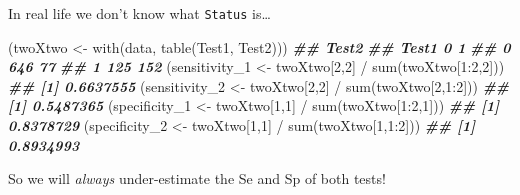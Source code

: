 \documentclass[
  ignorenonframetext,
  aspectratio=169,
]{beamer}
\newenvironment{Shaded}{\begin{snugshade}}{\end{snugshade}}
\newcommand{\DecValTok}[1]{\textcolor[rgb]{0.00,0.00,0.81}{#1}}
\newcommand{\DocumentationTok}[1]{\textcolor[rgb]{0.56,0.35,0.01}{\textbf{\textit{#1}}}}
\newcommand{\FunctionTok}[1]{\textcolor[rgb]{0.00,0.00,0.00}{#1}}
\newcommand{\NormalTok}[1]{#1}
\newcommand{\OtherTok}[1]{\textcolor[rgb]{0.56,0.35,0.01}{#1}}
\newcommand{\SpecialCharTok}[1]{\textcolor[rgb]{0.00,0.00,0.00}{#1}}
\begin{document}
\begin{frame}[fragile]
In real life we don't know what \texttt{Status} is\ldots{}

\scriptsize

\begin{Shaded}
\begin{Highlighting}[]
\NormalTok{(twoXtwo }\OtherTok{\textless{}{-}} \FunctionTok{with}\NormalTok{(data, }\FunctionTok{table}\NormalTok{(Test1, Test2)))}
\DocumentationTok{\#\#      Test2}
\DocumentationTok{\#\# Test1   0   1}
\DocumentationTok{\#\#     0 646  77}
\DocumentationTok{\#\#     1 125 152}
\NormalTok{(sensitivity\_1 }\OtherTok{\textless{}{-}}\NormalTok{ twoXtwo[}\DecValTok{2}\NormalTok{,}\DecValTok{2}\NormalTok{] }\SpecialCharTok{/} \FunctionTok{sum}\NormalTok{(twoXtwo[}\DecValTok{1}\SpecialCharTok{:}\DecValTok{2}\NormalTok{,}\DecValTok{2}\NormalTok{]))}
\DocumentationTok{\#\# [1] 0.6637555}
\NormalTok{(sensitivity\_2 }\OtherTok{\textless{}{-}}\NormalTok{ twoXtwo[}\DecValTok{2}\NormalTok{,}\DecValTok{2}\NormalTok{] }\SpecialCharTok{/} \FunctionTok{sum}\NormalTok{(twoXtwo[}\DecValTok{2}\NormalTok{,}\DecValTok{1}\SpecialCharTok{:}\DecValTok{2}\NormalTok{]))}
\DocumentationTok{\#\# [1] 0.5487365}
\NormalTok{(specificity\_1 }\OtherTok{\textless{}{-}}\NormalTok{ twoXtwo[}\DecValTok{1}\NormalTok{,}\DecValTok{1}\NormalTok{] }\SpecialCharTok{/} \FunctionTok{sum}\NormalTok{(twoXtwo[}\DecValTok{1}\SpecialCharTok{:}\DecValTok{2}\NormalTok{,}\DecValTok{1}\NormalTok{]))}
\DocumentationTok{\#\# [1] 0.8378729}
\NormalTok{(specificity\_2 }\OtherTok{\textless{}{-}}\NormalTok{ twoXtwo[}\DecValTok{1}\NormalTok{,}\DecValTok{1}\NormalTok{] }\SpecialCharTok{/} \FunctionTok{sum}\NormalTok{(twoXtwo[}\DecValTok{1}\NormalTok{,}\DecValTok{1}\SpecialCharTok{:}\DecValTok{2}\NormalTok{]))}
\DocumentationTok{\#\# [1] 0.8934993}
\end{Highlighting}
\end{Shaded}

\normalsize

\pause

So we will \emph{always} under-estimate the Se and Sp of both tests!
\end{frame}
\end{document}
